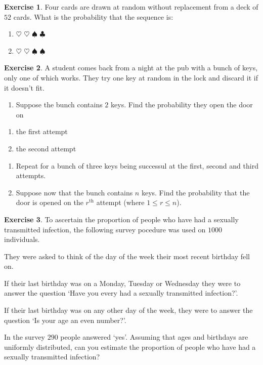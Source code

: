 \documentclass[
]{book}
\providecommand{\tightlist}{%
  \setlength{\itemsep}{0pt}\setlength{\parskip}{0pt}}
\theoremstyle{definition}
\theoremstyle{definition}
\theoremstyle{definition}
\newtheorem{exercise}{Exercise}[chapter]
\theoremstyle{definition}
\theoremstyle{remark}
\begin{document}
\begin{exercise}

Four cards are drawn at random without replacement from a deck of \(52\) cards. What is the probability that the sequence is:

\begin{enumerate}
\def\labelenumi{\alph{enumi})}
\item
  \(\heartsuit\) \(\heartsuit\) \(\spadesuit\) \(\clubsuit\)
\item
  \(\heartsuit\) \(\heartsuit\) \(\spadesuit\) \(\spadesuit\)
\end{enumerate}

\end{exercise}

\begin{exercise}

A student comes back from a night at the pub with a bunch of keys, only one of which works. They try one key at random in the lock and discard it if it doesn't fit.

\begin{enumerate}
\def\labelenumi{\alph{enumi})}
\tightlist
\item
  Suppose the bunch contains \(2\) keys. Find the probability they open the door on
\end{enumerate}

\begin{enumerate}
\def\labelenumi{(\roman{enumi})}
\item
  the first attempt
\item
  the second attempt
\end{enumerate}

\begin{enumerate}
\def\labelenumi{\alph{enumi})}
\setcounter{enumi}{1}
\item
  Repeat for a bunch of three keys being successul at the first, second and third attempts.
\item
  Suppose now that the bunch contains \(n\) keys. Find the probability that the door is opened on the \(r^{\text{th}}\) attempt (where \(1\leq r \leq n\)).
\end{enumerate}

\end{exercise}

\begin{exercise}
To ascertain the proportion of people who have had a sexually transmitted infection, the following survey pocedure was used on \(1000\) individuals.

They were asked to think of the day of the week their most recent birthday fell on.

If their last birthday was on a Monday, Tuesday or Wednesday they were to answer the question `Have you every had a sexually transmitted infection?'.

If their last birthday was on any other day of the week, they were to answer the question `Is your age an even number?'.

In the survey \(290\) people answered `yes'. Assuming that ages and birthdays are uniformly distributed, can you estimate the proportion of people who have had a sexually transmitted infection?
\end{exercise}
\end{document}
